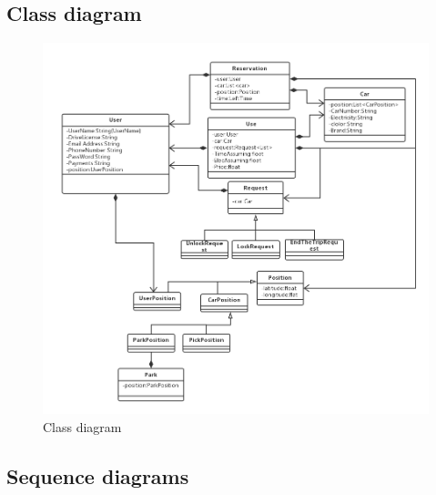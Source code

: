 \documentclass[12pt, letterpaper]{article}
\begin{document}
\newpage

\subsection{Class diagram}


\begin{figure}[H]
\centering
\includegraphics[width=\textwidth]{ClassDiagramfinal.png}
\caption{Class diagram}
\label{fig:Class}
\end{figure}

\newpage

\subsection{Sequence diagrams}
\end{document}
